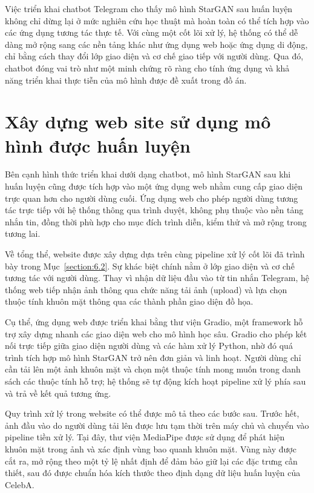\documentclass[../DoAn.tex]{subfiles}
\begin{document}
Việc triển khai chatbot Telegram cho thấy mô hình StarGAN sau huấn luyện không chỉ dừng lại ở mức nghiên cứu học thuật mà hoàn toàn có thể tích hợp vào các ứng dụng tương tác thực tế. Với cùng một cốt lõi xử lý, hệ thống có thể dễ dàng mở rộng sang các nền tảng khác như ứng dụng web hoặc ứng dụng di động, chỉ bằng cách thay đổi lớp giao diện và cơ chế giao tiếp với người dùng. Qua đó, chatbot đóng vai trò như một minh chứng rõ ràng cho tính ứng dụng và khả năng triển khai thực tiễn của mô hình được đề xuất trong đồ án.








\section{Xây dựng web site sử dụng mô hình được huấn luyện}
\label{section:6.4}

Bên cạnh hình thức triển khai dưới dạng chatbot, mô hình StarGAN sau khi huấn luyện cũng được tích hợp vào một ứng dụng web nhằm cung cấp giao diện trực quan hơn cho người dùng cuối. Ứng dụng web cho phép người dùng tương tác trực tiếp với hệ thống thông qua trình duyệt, không phụ thuộc vào nền tảng nhắn tin, đồng thời phù hợp cho mục đích trình diễn, kiểm thử và mở rộng trong tương lai.

Về tổng thể, website được xây dựng dựa trên cùng pipeline xử lý cốt lõi đã trình bày trong Mục~\ref{section:6.2}. Sự khác biệt chính nằm ở lớp giao diện và cơ chế tương tác với người dùng. Thay vì nhận dữ liệu đầu vào từ tin nhắn Telegram, hệ thống web tiếp nhận ảnh thông qua chức năng tải ảnh (upload) và lựa chọn thuộc tính khuôn mặt thông qua các thành phần giao diện đồ họa.

Cụ thể, ứng dụng web được triển khai bằng thư viện Gradio, một framework hỗ trợ xây dựng nhanh các giao diện web cho mô hình học sâu. Gradio cho phép kết nối trực tiếp giữa giao diện người dùng và các hàm xử lý Python, nhờ đó quá trình tích hợp mô hình StarGAN trở nên đơn giản và linh hoạt. Người dùng chỉ cần tải lên một ảnh khuôn mặt và chọn một thuộc tính mong muốn trong danh sách các thuộc tính hỗ trợ; hệ thống sẽ tự động kích hoạt pipeline xử lý phía sau và trả về kết quả tương ứng.

Quy trình xử lý trong website có thể được mô tả theo các bước sau. Trước hết, ảnh đầu vào do người dùng tải lên được lưu tạm thời trên máy chủ và chuyển vào pipeline tiền xử lý. Tại đây, thư viện MediaPipe được sử dụng để phát hiện khuôn mặt trong ảnh và xác định vùng bao quanh khuôn mặt. Vùng này được cắt ra, mở rộng theo một tỷ lệ nhất định để đảm bảo giữ lại các đặc trưng cần thiết, sau đó được chuẩn hóa kích thước theo định dạng dữ liệu huấn luyện của CelebA.
\end{document}
